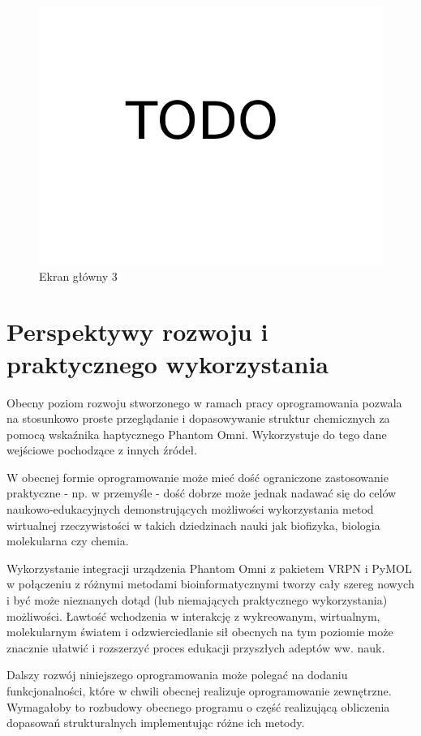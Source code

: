 \documentclass[licencjacka]{pracamgr}
\begin{document}
\begin{figure}[H]
\centering
\includegraphics[scale=0.3,center]{todo}
\caption{Ekran główny 3}
\end{figure}

\chapter{Perspektywy rozwoju i praktycznego wykorzystania}
Obecny poziom rozwoju stworzonego w ramach pracy oprogramowania pozwala na stosunkowo proste przeglądanie i dopasowywanie struktur chemicznych za pomocą wskaźnika haptycznego Phantom Omni. Wykorzystuje do tego dane wejściowe pochodzące z innych źródeł.

W obecnej formie oprogramowanie może mieć dość ograniczone zastosowanie praktyczne - np. w przemyśle - dość dobrze może jednak nadawać się do celów naukowo-edukacyjnych demonstrujących możliwości wykorzystania metod wirtualnej rzeczywistości w takich dziedzinach nauki jak biofizyka, biologia molekularna czy chemia.

Wykorzystanie integracji urządzenia Phantom Omni z pakietem VRPN i PyMOL w połączeniu z różnymi metodami bioinformatycznymi tworzy cały szereg nowych i być może nieznanych dotąd (lub niemających praktycznego wykorzystania) możliwości. Ławtość wchodzenia w interakcję z wykreowanym, wirtualnym, molekularnym światem i odzwierciedlanie sił obecnych na tym poziomie może znacznie ułatwić i rozszerzyć proces edukacji przyszłych adeptów ww. nauk. 

Dalszy rozwój niniejszego oprogramowania może polegać na dodaniu funkcjonalności, które w chwili obecnej realizuje oprogramowanie zewnętrzne. Wymagałoby to rozbudowy obecnego programu o część realizującą obliczenia dopasowań strukturalnych implementując różne ich metody. 
\end{document}
